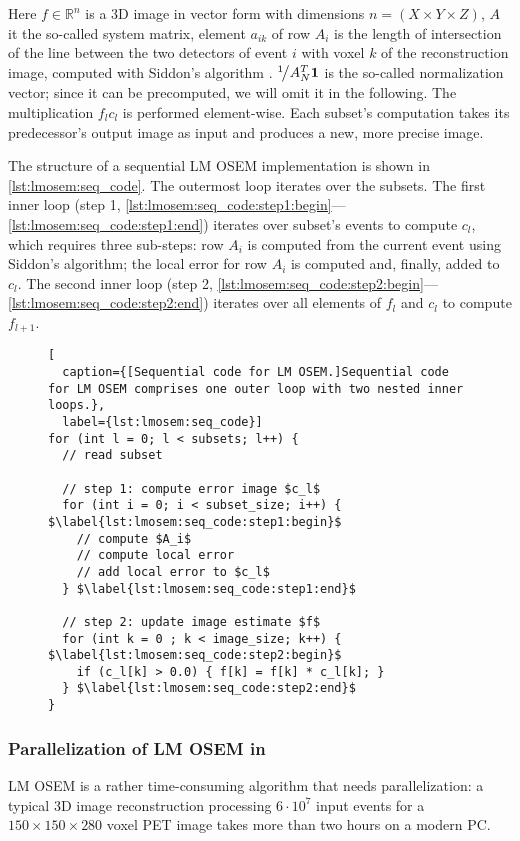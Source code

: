 Here $f \in \mathbb{R}^n$ is a 3D image in vector form with dimensions $n = (X \times Y \times Z)$, $A$ it the so-called system matrix, element $a_{ik}$ of row $A_i$ is the length of intersection of the line between the two detectors of event $i$ with voxel $k$ of the reconstruction image, computed with Siddon's algorithm \cite{Siddon1985}.
${}^{1}\!\big/{A_N^T \textbf{1}}$ is the so-called normalization vector; since it can be precomputed, we will omit it in the following.
The multiplication $f_{l}c_{l}$ is performed element-wise.
Each subset's computation takes its predecessor's output image as input and produces a new, more precise image.

The structure of a sequential LM OSEM implementation is shown in \autoref{lst:lmosem:seq_code}.
The outermost loop iterates over the subsets.
The first inner loop (step 1, \autoref{lst:lmosem:seq_code:step1:begin}---\autoref{lst:lmosem:seq_code:step1:end}) iterates over subset's events to compute $c_l$, which requires three sub-steps:
row $A_i$ is computed from the current event using Siddon's algorithm;
the local error for row $A_i$ is computed and, finally, added to $c_l$.
The second inner loop (step 2, \autoref{lst:lmosem:seq_code:step2:begin}---\autoref{lst:lmosem:seq_code:step2:end}) iterates over all elements of $f_l$ and $c_l$ to compute $f_{l+1}$.
\begin{figure}
\begin{lstlisting}[
  caption={[Sequential code for LM OSEM.]Sequential code for LM OSEM comprises one outer loop with two nested inner loops.},
  label={lst:lmosem:seq_code}]
for (int l = 0; l < subsets; l++) {
  // read subset

  // step 1: compute error image $c_l$
  for (int i = 0; i < subset_size; i++) { $\label{lst:lmosem:seq_code:step1:begin}$
    // compute $A_i$
    // compute local error
    // add local error to $c_l$
  } $\label{lst:lmosem:seq_code:step1:end}$

  // step 2: update image estimate $f$
  for (int k = 0 ; k < image_size; k++) { $\label{lst:lmosem:seq_code:step2:begin}$
    if (c_l[k] > 0.0) { f[k] = f[k] * c_l[k]; }
  } $\label{lst:lmosem:seq_code:step2:end}$
}
\end{lstlisting}
\end{figure}

\subsubsection{Parallelization of LM OSEM in \OpenCL}
\label{sec:parallel_implementation}
LM OSEM is a rather time-consuming algorithm that needs parallelization:
a typical 3D image reconstruction processing $6 \cdot 10^7$ input events for a $150 \times 150 \times 280$ voxel PET image takes more than two hours on a modern PC.

